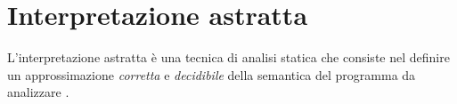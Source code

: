 \chapter{Interpretazione astratta}

L'interpretazione astratta è una tecnica di analisi statica che consiste nel definire un approssimazione \emph{corretta} e \emph{decidibile} della semantica del programma da analizzare \cite{cousot}.



